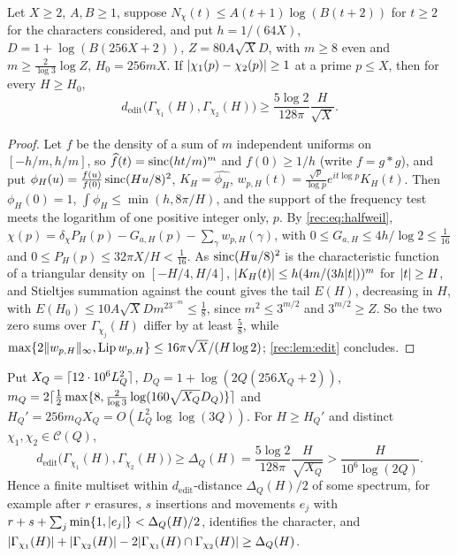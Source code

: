 \begin{theorem}\label{rec:thm:interface}
Let $X\ge2$, $A,B\ge1$, suppose $N_\chi(t)\le A(t+1)\log(B(t+2))$ for $t\ge2$ for the characters considered,
and put $h=1/(64X)$, $D=1+\log(B(256X+2))$, $Z=80A\sqrt XD$, with $m\ge8$ even and $m\ge\frac2{\log3}\log Z$,
$H_0=256mX$. If $\lvert\chi_1(p)-\chi_2(p)\rvert\ge1$ at a prime $p\le X$, then for every $H\ge H_0$,
\[
 d_{\mathrm{edit}}\bigl(\Gamma_{\chi_1}(H),\Gamma_{\chi_2}(H)\bigr)\ge\frac{5\log2}{128\pi}\frac H{\sqrt X}.
\]
\end{theorem}

\begin{proof}
Let $f$ be the density of a sum of $m$ independent uniforms on $[-h/m,h/m]$, so
$\widehat f(t)=\operatorname{sinc}(ht/m)^m$ and $f(0)\ge1/h$ (write $f=g*g$), and put
$\phi_H(u)=\frac{f(u)}{f(0)}\operatorname{sinc}(Hu/8)^2$, $K_H=\widehat{\phi_H}$, $w_{p,H}(t)=\frac{\sqrt p}{\log p}e^{it\log p}K_H(t)$. Then
$\phi_H(0)=1$, $\int\phi_H\le\min(h,8\pi/H)$, and the support of the frequency test meets the logarithm of
one positive integer only, $p$. By \eqref{rec:eq:halfweil},
$\chi(p)=\delta_\chi P_H(p)-G_{a,H}(p)-\sum_\gamma w_{p,H}(\gamma)$, with $0\le G_{a,H}\le4h/\log2\le\tfrac1{16}$ and
$0\le P_H(p)\le32\pi X/H<\tfrac1{16}$. As $\operatorname{sinc}(Hu/8)^2$ is the characteristic function of a triangular
density on $[-H/4,H/4]$, $\lvert K_H(t)\rvert\le h(4m/(3h\lvert t\rvert))^m$ for $\lvert t\rvert\ge H$, and Stieltjes summation against
the count gives the tail $E(H)$, decreasing in $H$, with
$E(H_0)\le10A\sqrt XDm^23^{-m}\le\tfrac18$, since $m^2\le3^{m/2}$ and $3^{m/2}\ge Z$. So the two zero sums over
$\Gamma_{\chi_j}(H)$ differ by at least $\tfrac58$, while $\max\{2\lVert w_{p,H}\rVert_\infty,\operatorname{Lip}w_{p,H}\}\le16\pi\sqrt X/(H\log2)$;
\cref{rec:lem:edit} concludes.
\end{proof}

\begin{theorem}\label{rec:thm:robust}
Put $X_Q=\lceil12\cdot10^6L_Q^2\rceil$, $D_Q=1+\log(2Q(256X_Q+2))$,
$m_Q=2\lceil\tfrac12\max\{8,\frac2{\log3}\log(160\sqrt{X_Q}D_Q)\}\rceil$ and $H_Q'=256m_QX_Q=O(L_Q^2\log\log(3Q))$. For
$H\ge H_Q'$ and distinct $\chi_1,\chi_2\in\mathcal C(Q)$,
\[
 d_{\mathrm{edit}}\bigl(\Gamma_{\chi_1}(H),\Gamma_{\chi_2}(H)\bigr)\ge\Delta_Q(H)=\frac{5\log2}{128\pi}\frac H{\sqrt{X_Q}}>\frac H{10^6\log(2Q)} .
\]
Hence a finite multiset within $d_{\mathrm{edit}}$-distance $\Delta_Q(H)/2$ of some spectrum, for example after
$r$ erasures, $s$ insertions and movements $e_j$ with $r+s+\sum_j\min\{1,\lvert e_j\rvert\}<\Delta_Q(H)/2$, identifies
the character, and $\lvert\Gamma_{\chi_1}(H)\rvert+\lvert\Gamma_{\chi_2}(H)\rvert-2\lvert\Gamma_{\chi_1}(H)\cap\Gamma_{\chi_2}(H)\rvert\ge\Delta_Q(H)$.
\end{theorem}

